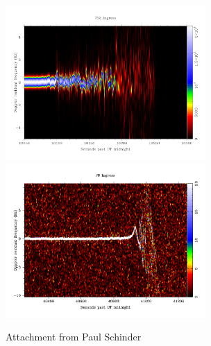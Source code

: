 \documentclass[crop=false,class=book]{standalone}
\begin{document}
        \begin{figure}[H]
            \centering
            \captionsetup{type=figure}
            \includegraphics[page=1,width=3in]{non_copy.pdf}
            \hfill
            \includegraphics[width=3in]{non.png}
            \caption{Attachment from Paul Schinder}
        \end{figure}
\end{document}
